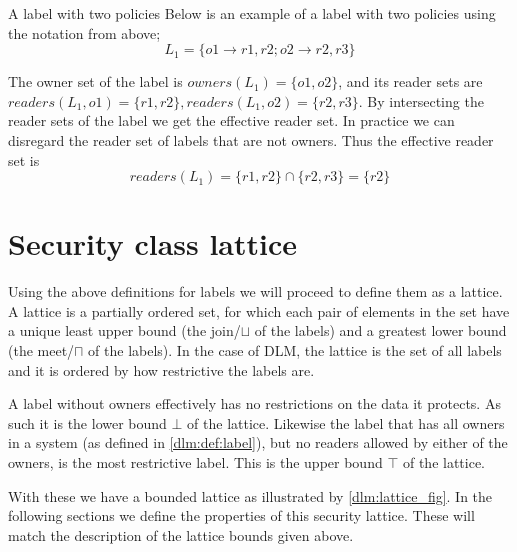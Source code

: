 \begin{example}{A label with two policies}\label{dlm:ex:simple_label}
  Below is an example of a label with two policies using the notation from above;
  $$L_1 = \{o1 \rightarrow r1, r2; o2 \rightarrow r2, r3\}$$

  The owner set of the label is $owners(L_1) = \{o1, o2\}$, and its reader sets are $readers(L_1, o1) = \{r1, r2\}, readers(L_1, o2) = \{r2, r3\}$.
  By intersecting the reader sets of the label we get the effective reader set.
  In practice we can disregard the reader set of labels that are not owners.
  Thus the effective reader set is
  $$readers(L_1) = \{r1,r2\} \cap \{r2, r3\} = \{r2\}$$
\end{example}

\section{Security class lattice}
Using the above definitions for labels we will proceed to define them as a lattice.
A lattice is a partially ordered set, for which each pair of elements in the set have a unique least upper bound (the join/$\sqcup$ of the labels) and a greatest lower bound (the meet/$\sqcap$ of the labels).
In the case of DLM, the lattice is the set of all labels and it is ordered by how restrictive the labels are.

A label without owners effectively has no restrictions on the data it protects.
As such it is the lower bound $\bot$ of the lattice.
Likewise the label that has all owners in a system (as defined in \cref{dlm:def:label}), but no readers allowed by either of the owners, is the most restrictive label.
This is the upper bound $\top$ of the lattice.

With these we have a bounded lattice as illustrated by \cref{dlm:lattice_fig}.
In the following sections we define the properties of this security lattice.
These will match the description of the lattice bounds given above.


